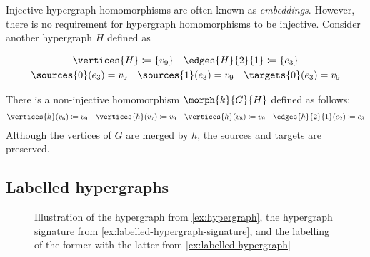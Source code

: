 \begin{example}
\begin{center}
\begin{minipage}{0.2\textwidth}
            \vspace{1.5em}

        \end{minipage}
    \end{center}

    Injective hypergraph homomorphisms are often known as \emph{embeddings}.
    However, there is no requirement for hypergraph homomorphisms to be
    injective.
    Consider another hypergraph \(H\) defined as
    \begin{center}
        \begin{minipage}{0.75\textwidth}
            \begin{gather*}
                \vertices{H} \coloneqq \{v_9\}
                \quad
                \edges{H}{2}{1} \coloneqq \{e_3\}
                \\
                \sources{0}(e_3) = v_9
                \quad
                \sources{1}(e_3) = v_9
                \quad
                \targets{0}(e_3) = v_9
            \end{gather*}
        \end{minipage}
        \begin{minipage}{0.2\textwidth}
            \centering

            \vspace{1.5em}

        \end{minipage}
    \end{center}
    There is a non-injective homomorphism \(\morph{k}{G}{H}\) defined as
    follows:
    \begin{gather*}
        \vertices{h}(v_6) \coloneqq v_9
        \quad
        \vertices{h}(v_7) \coloneqq v_9
        \quad
        \vertices{h}(v_8) \coloneqq v_9
        \quad
        \edges{h}{2}{1}(e_2) \coloneqq e_3
    \end{gather*}
    Although the vertices of \(G\) are merged by \(h\), the sources and
    targets are preserved.
\end{example}

\subsection{Labelled hypergraphs}

\begin{figure}
    \centering
    \qquad
    \qquad
    \caption{Illustration of the hypergraph from \cref{ex:hypergraph}, the
        hypergraph signature from \cref{ex:labelled-hypergraph-signature}, and the
        labelling of the former with the latter from
        \cref{ex:labelled-hypergraph}
    }
    \label{fig:hypergraph-ex}
\end{figure}

